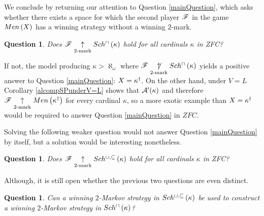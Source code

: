\documentclass{amsart}
\theoremstyle{plain}
\newtheorem{question}[theorem]{Question}
\theoremstyle{definition}
\theoremstyle{remark}
\theoremstyle{plain}
\theoremstyle{definition}
\theoremstyle{remark}
\begin{document}
  We conclude by returning our attention to Question \ref{mainQuestion},
  which asks whether there exists a space for which the second player
  \(\mathscr{F}\) in the game \(Men\left({X}\right)\) has a winning strategy
  without a winning \(2\)-mark.

  \begin{question}
    Does
    \(\mathscr{F}\underset{2\text{-mark}}{\uparrow}Sch^{\cap}\left({\kappa}\right)\) hold for all cardinals
    \(\kappa\) in ZFC?
  \end{question}

  If not, the model producing \(\kappa>\aleph_\omega\) where
  \(\mathscr{F}\underset{2\text{-mark}}{\not\uparrow}Sch^{\cap}\left({\kappa}\right)\) yields a positive
  answer to Question \ref{mainQuestion}:
  \(X=\kappa^\dagger\). On the other hand, under \(V=L\)
  Corollary \ref{alcompSPunderV=L} shows that
  \(\mathcal{A}'(\kappa)\) and therefore
  \(\mathscr{F}\underset{2\text{-mark}}{\uparrow}Men\left({\kappa^\dagger}\right)\)
  for every cardinal \(\kappa\), so a more exotic example than
  \(X=\kappa^\dagger\) would be required to
  answer Question \ref{mainQuestion} in \(ZFC\).

  Solving the following weaker question would not answer Question
  \ref{mainQuestion} by itself, but a solution would be interesting nonetheless.

  \begin{question}
    Does
    \(\mathscr{F}\underset{2\text{-mark}}{\uparrow}Sch^{\cup,\subseteq}\left({\kappa}\right)\) hold for all cardinals
    \(\kappa\) in ZFC?
  \end{question}

  Although, it is still open whether the previous two questions are even
  distinct.

  \begin{question}
    Can a winning \(2\)-Markov strategy in \(Sch^{\cup,\subseteq}\left({\kappa}\right)\)
    be used to construct a winning \(2\)-Markov strategy in
    \(Sch^{\cap}\left({\kappa}\right)\)?
  \end{question}






\end{document}
